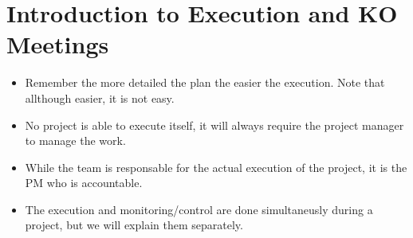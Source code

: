 \section{Introduction to Execution and KO Meetings}
\begin{itemize}
    \item Remember the more detailed the plan the easier the execution. Note that allthough easier, it is not easy.
    \item No project is able to execute itself, it will always require the project manager to manage the work.
    \item While the team is responsable for the actual execution of the project, it is the PM who is accountable.
    \item The execution and monitoring/control are done simultaneusly during a project, but we will explain them separately.
\end{itemize}

